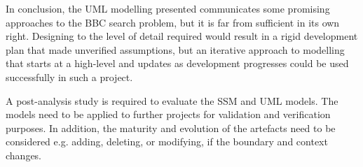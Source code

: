 \documentclass{llncs}
\begin{document}
In conclusion, the UML modelling presented communicates some promising
approaches to
the BBC search problem, but it is far from sufficient in its own right.
Designing to the level of detail required would result in a rigid
development plan that made unverified assumptions, but an iterative
approach to modelling that starts at a high-level and updates as
development progresses could be used successfully in such a project.

A post-analysis study is required to evaluate the SSM and UML models. The models
need to be applied to further projects for validation and verification purposes.
In addition, the maturity and evolution of the artefacts need to be considered
e.g. adding, deleting, or modifying, if the boundary and context changes.



\end{document}
